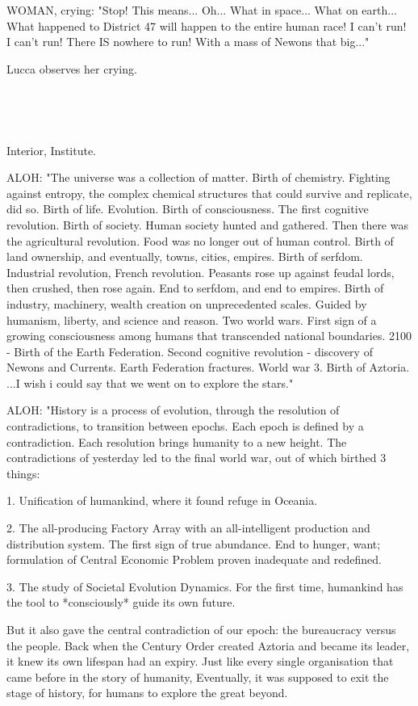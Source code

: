 \documentclass[11pt]{article}
\begin{document}
WOMAN, crying: "Stop! This means... Oh... What in space... What on earth...
What happened to District 47 will happen to the entire human race!
I can't run! 
I can't run!
There IS nowhere to run!
With a mass of Newons that big..."

Lucca observes her crying.

\ 

\ 

Interior, Institute.

ALOH: "The universe was a collection of matter.
Birth of chemistry.
Fighting against entropy, the complex chemical structures that could survive and replicate, did so.
Birth of life.
Evolution.
Birth of consciousness.
The first cognitive revolution.
Birth of society.
Human society hunted and gathered.
Then there was the agricultural revolution.
Food was no longer out of human control.
Birth of land ownership, and eventually, towns, cities, empires.
Birth of serfdom.
Industrial revolution, French revolution. 
Peasants rose up against feudal lords, then crushed, then rose again. End to serfdom, and end to empires.
Birth of industry, machinery, wealth creation on unprecedented scales.
Guided by humanism, liberty, and science and reason.
Two world wars.
First sign of a growing consciousness among humans that transcended national boundaries.
2100 - Birth of the Earth Federation.
Second cognitive revolution - discovery of Newons and Currents.
Earth Federation fractures. 
World war 3.
Birth of Aztoria.
...I wish i could say that we went on to explore the stars."

ALOH: "History is a process of evolution, through the resolution of contradictions, to transition between epochs.
Each epoch is defined by a contradiction.
Each resolution brings humanity to a new height.
The contradictions of yesterday led to the final world war, out of which birthed 3 things:

1. Unification of humankind, where it found refuge in Oceania.

2. The all-producing Factory Array with an all-intelligent production and distribution system. The first sign of true abundance. End to hunger, want; formulation of Central Economic Problem proven inadequate and redefined.

3. The study of Societal Evolution Dynamics. For the first time, humankind has the tool to *consciously* guide its own future.

But it also gave the central contradiction of our epoch: the bureaucracy versus the people. 
Back when the Century Order created Aztoria and became its leader, it knew its own lifespan had an expiry. 
Just like every single organisation that came before in the story of humanity,
Eventually, it was supposed to exit the stage of history, for humans to explore the great beyond.
\end{document}
